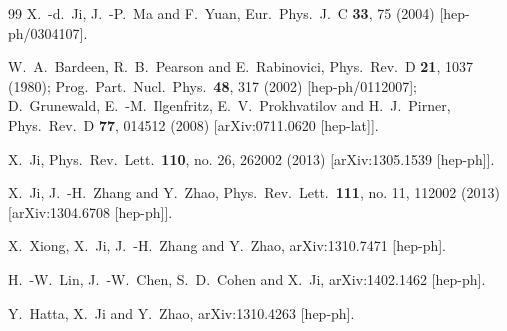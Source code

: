\begin{thebibliography}{99}
  X.~-d.~Ji, J.~-P.~Ma and F.~Yuan,
  Eur.\ Phys.\ J.\ C {\bf 33}, 75 (2004)
  [hep-ph/0304107].

  W.~A.~Bardeen, R.~B.~Pearson and E.~Rabinovici,
  Phys.\ Rev.\ D {\bf 21}, 1037 (1980);
  Prog.\ Part.\ Nucl.\ Phys.\  {\bf 48}, 317 (2002)
  [hep-ph/0112007];
  D.~Grunewald, E.~-M.~Ilgenfritz, E.~V.~Prokhvatilov and H.~J.~Pirner,
  Phys.\ Rev.\ D {\bf 77}, 014512 (2008)
  [arXiv:0711.0620 [hep-lat]].


  X.~Ji,
  Phys.\ Rev.\ Lett.\  {\bf 110}, no. 26, 262002 (2013)
  [arXiv:1305.1539 [hep-ph]].

  X.~Ji, J.~-H.~Zhang and Y.~Zhao,
  Phys.\ Rev.\ Lett.\  {\bf 111}, no. 11, 112002 (2013)
  [arXiv:1304.6708 [hep-ph]].

  X.~Xiong, X.~Ji, J.~-H.~Zhang and Y.~Zhao,
  arXiv:1310.7471 [hep-ph].

  H.~-W.~Lin, J.~-W.~Chen, S.~D.~Cohen and X.~Ji,
  arXiv:1402.1462 [hep-ph].

  Y.~Hatta, X.~Ji and Y.~Zhao,
  arXiv:1310.4263 [hep-ph].


\end{thebibliography}
